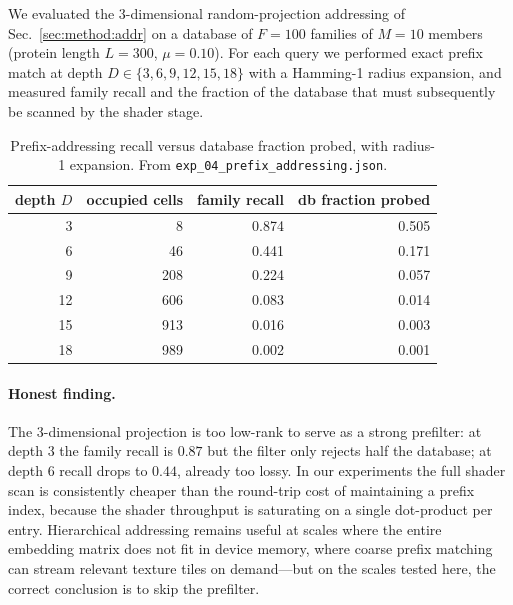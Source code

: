\documentclass[twocolumn,11pt,a4paper]{article}
\theoremstyle{definition}
\theoremstyle{remark}
\begin{document}
We evaluated the $3$-dimensional random-projection addressing of
Sec.~\ref{sec:method:addr} on a database of $F = 100$ families of $M = 10$
members (protein length $L = 300$, $\mu = 0.10$). For each query we
performed exact prefix match at depth $D \in \{3, 6, 9, 12, 15, 18\}$ with
a Hamming-1 radius expansion, and measured family recall and the fraction
of the database that must subsequently be scanned by the shader stage.



\begin{table}[t]
  \centering\small
  \caption{Prefix-addressing recall versus database fraction probed, with
  radius-1 expansion. From \texttt{exp\_04\_prefix\_addressing.json}.}
  \label{tab:prefix}
  \begin{tabular}{r | r r r}
    \toprule
    depth $D$ & occupied cells & family recall & db fraction probed \\
    \midrule
    3  &    8 & 0.874 & 0.505 \\
    6  &   46 & 0.441 & 0.171 \\
    9  &  208 & 0.224 & 0.057 \\
    12 &  606 & 0.083 & 0.014 \\
    15 &  913 & 0.016 & 0.003 \\
    18 &  989 & 0.002 & 0.001 \\
    \bottomrule
  \end{tabular}
\end{table}

\paragraph{Honest finding.} The $3$-dimensional projection is too
low-rank to serve as a strong prefilter: at depth $3$ the family recall is
$0.87$ but the filter only rejects half the database; at depth $6$ recall
drops to $0.44$, already too lossy. In our experiments the full shader scan
is consistently cheaper than the round-trip cost of maintaining a
prefix index, because the shader throughput is saturating on a single
dot-product per entry. Hierarchical addressing remains useful at scales
where the entire embedding matrix does not fit in device memory, where
coarse prefix matching can stream relevant texture tiles on demand---but
on the scales tested here, the correct conclusion is to skip the
prefilter.
\end{document}
